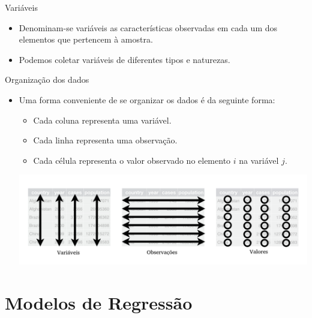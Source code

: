 \documentclass[10pt,
  aspectratio=169,
  serif,
  mathserif,
  professionalfont,
  compress,
  handout,
  ]{beamer}\usepackage[]{graphicx}\usepackage[]{color}
\begin{document}
\begin{frame}[c, allowframebreaks]

Variáveis

\begin{itemize}

  \item Denominam-se variáveis as características observadas em cada um dos elementos que pertencem à amostra. 
  
  \item Podemos coletar variáveis de diferentes tipos e naturezas.
\end{itemize}

\framebreak 

Organização dos dados

\begin{itemize}
  \item Uma forma conveniente de se organizar os dados é da seguinte forma:
    \begin{itemize}
      \item Cada coluna representa uma variável.
      \item Cada linha representa uma observação.
      \item Cada célula representa o valor observado no elemento $i$ na variável $j$.
    \end{itemize}

  
      
\includegraphics[width=\textwidth]{img/tidy-data_t.png}

\end{itemize}

\end{frame}


\section{Modelos de Regressão}
\end{document}
